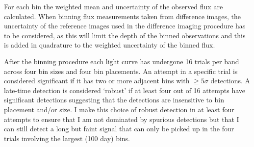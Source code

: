 \documentclass[a4paper,oneside,12pt, class=Latex/Classes/PhDthesisPSnPDF, crop=false]{standalone}
\begin{document}
For each bin the weighted mean and uncertainty of the observed flux are calculated. When binning flux measurements taken from difference images, the uncertainty of the reference images used in the difference imaging procedure has to be considered, as this will limit the depth of the binned observations \citep{ref_uncert} and this is added in quadrature to the weighted uncertainty of the binned flux. 

After the binning procedure each light curve has undergone 16 trials per band across four bin sizes and four bin placements. An attempt in a specific trial is considered significant if it has two or more adjacent bins with $\ge5\sigma$ detections. A late-time detection is considered `robust' if at least four out of 16 attempts have significant detections suggesting that the detections are insensitive to bin placement and/or size. I make this choice of robust detection in at least four attempts to ensure that I am not dominated by spurious detections but that I can still detect a long but faint signal that can only be picked up in the four trials involving the largest (100 day) bins. 
\end{document}
